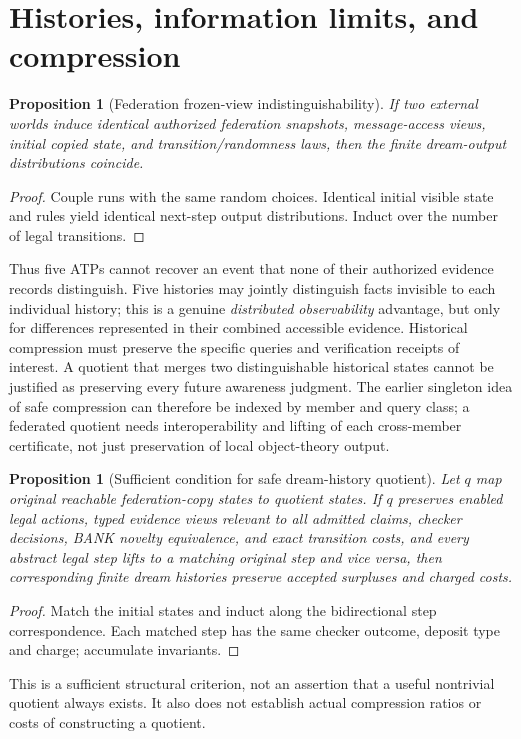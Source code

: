 \documentclass[11pt]{article}
\newtheorem{proposition}[theorem]{Proposition}
\begin{document}
\section{Histories, information limits, and compression}
\begin{proposition}[Federation frozen-view indistinguishability]
If two external worlds induce identical authorized federation snapshots, message-access views, initial copied state, and transition/randomness laws, then the finite dream-output distributions coincide.
\end{proposition}
\begin{proof}Couple runs with the same random choices. Identical initial visible state and rules yield identical next-step output distributions. Induct over the number of legal transitions.\end{proof}
Thus five ATPs cannot recover an event that none of their authorized evidence records distinguish. Five histories may jointly distinguish facts invisible to each individual history; this is a genuine \emph{distributed observability} advantage, but only for differences represented in their combined accessible evidence. Historical compression must preserve the specific queries and verification receipts of interest. A quotient that merges two distinguishable historical states cannot be justified as preserving every future awareness judgment. The earlier singleton idea of safe compression can therefore be indexed by member and query class; a federated quotient needs interoperability and lifting of each cross-member certificate, not just preservation of local object-theory output.
\begin{proposition}[Sufficient condition for safe dream-history quotient]
Let $q$ map original reachable federation-copy states to quotient states. If $q$ preserves enabled legal actions, typed evidence views relevant to all admitted claims, checker decisions, BANK novelty equivalence, and exact transition costs, and every abstract legal step lifts to a matching original step and vice versa, then corresponding finite dream histories preserve accepted surpluses and charged costs.
\end{proposition}
\begin{proof}Match the initial states and induct along the bidirectional step correspondence. Each matched step has the same checker outcome, deposit type and charge; accumulate invariants.\end{proof}
This is a sufficient structural criterion, not an assertion that a useful nontrivial quotient always exists. It also does not establish actual compression ratios or costs of constructing a quotient.
\end{document}
